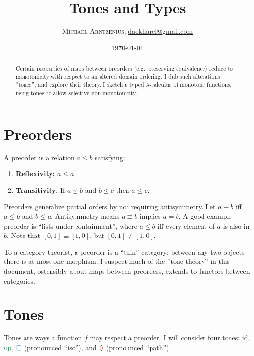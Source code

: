 \documentclass{rntz}
\title{Tones and Types}
\author{{\scshape Michael Arntzenius}, %
  \href{mailto:daekharel@gmail.com}{daekharel@gmail.com}}
\date{\today}
\newcommand\opcolor{\color{ForestGreen}}
\newcommand\isocolor{\color{NavyBlue}}
\newcommand\pathcolor{\color{Bittersweet}}
\newcommand\id{\ensuremath{\mathrm{id}}}
\newcommand\op{\ensuremath{\mathrm{\opcolor op}}}
\newcommand\iso{\texorpdfstring{\ensuremath{{\isocolor\Box}}}{iso}}
\renewcommand\path{\texorpdfstring{\ensuremath{{\pathcolor\lozenge}}}{path}}
\begin{document}

\maketitle

\begin{abstract}
 Certain properties of maps between preorders (e.g.\ preserving equivalence)
 reduce to monotonicity with respect to an altered domain ordering. I dub such
 alterations ``tones'', and explore their theory. I sketch a typed
 $\lambda$-calculus of monotone functions, using tones to allow selective
 non-mono\-tonicity.
\end{abstract}

\section{Preorders}

A preorder is a relation $a \le b$ satisfying:
\begin{enumerate}
\item \textbf{Reflexivity:} $a \le a$.
\item \textbf{Transitivity:} If $a \le b$ and $b \le c$ then $a \le c$.
\end{enumerate}

Preorders generalize partial orders by not requiring antisymmetry. Let
$a \equiv b$ iff $a \le b$ and $b \le a$. Antisymmetry means $a \equiv b$
implies $a = b$.
%
A good example preorder is ``lists under containment'', where $a \le b$ iff
every element of $a$ is also in $b$. Note that $[0,1] \equiv [1,0]$, but $[0,1]
\ne [1,0]$.

To a category theorist, a preorder is a ``thin'' category: between any two
objects there is at most one morphism. I suspect much of the ``tone theory'' in
this document, ostensibly about maps between preorders, extends to functors
between categories.


\section{Tones}\label{sec:tones}

Tones are ways a function $f$ may respect a preorder. I will consider four
tones: \id, \op, \iso{} (pronounced ``iso''), and \path{} (pronounced ``path'').
\end{document}

